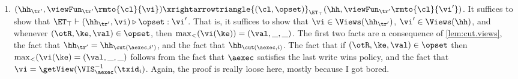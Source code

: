 \begin{itemize}
\begin{enumerate}
\item $(\hh_{\tr'}, \viewFun_{\tr'}\rmto{\cl}{\vi}) \xrightarrowtriangle{(\cl, \opset)}_{\ET_{\top}} 
(\hh,  \viewFun_{\tr'}\rmto{\cl}{\vi'})$. It suffices to show that $\ET_{\top} \vdash (\hh_{\tr'}, \vi) 
\triangleright \opset: \vi'$. That is, it suffices to show that $\vi \in \Views(\hh_{\tr'})$, 
$\vi' \in \Views(\hh)$, and whenever $(\otR, \ke, \val) \in \opset$, then 
$\max_{<}(\vi(\ke)) = (\val, \_, \_)$. The first two facts are a consequence of 
\ref{lem:cut.views}, the fact that $\hh_{\tr'} = \hh_{\cut(\aexec, i')}$, and the fact that 
$\hh_{\cut(\aexec, i)}$. The fact that if $(\otR, \ke, \val) \in \opset$ then 
$\max_{<}(\vi(\ke) = (\val, \_, \_)$ follows from the fact that $\aexec$ satisfies 
the last write wins policy, and the fact that $\vi = \getView(\VIS^{-1}_{\aexec}(\txid_{i})$.
\ac{Again, the proof is really loose here, mostly because I got bored.}
\end{enumerate} 

\end{itemize}